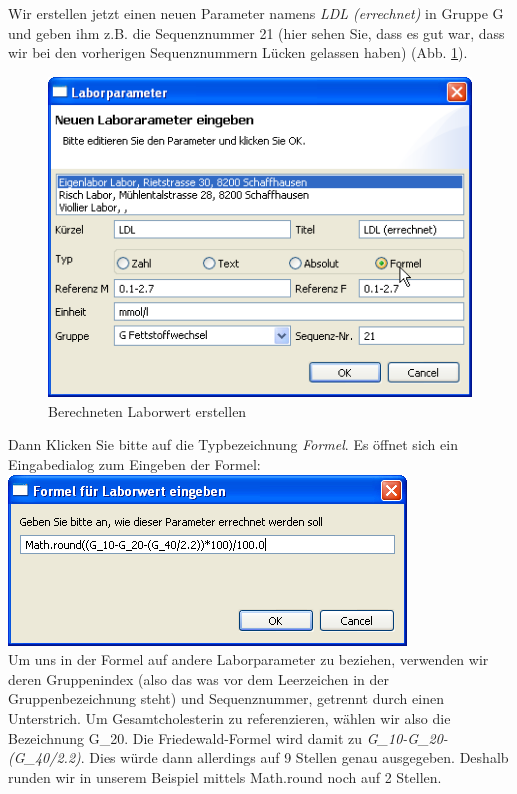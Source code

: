 Wir erstellen jetzt einen neuen Parameter namens \textit{LDL (errechnet)} in Gruppe G und geben ihm z.B. die Sequenznummer 21 (hier sehen Sie, dass es gut war, dass wir bei den vorherigen Sequenznummern Lücken gelassen haben) (Abb. \ref{fig:labor2}).
\begin{figure}[htp]
\begin{center}
  \includegraphics{images/labor2}
  \caption{Berechneten Laborwert erstellen}
  \label{fig:labor2}
\end{center}
\end{figure}
 Dann Klicken Sie bitte auf die Typbezeichnung \textit{Formel}. Es öffnet sich ein Eingabedialog zum Eingeben der Formel:\\
 \includegraphics{images/labor3}\\
Um uns in der Formel auf andere Laborparameter zu beziehen, verwenden wir deren Gruppenindex (also das was vor dem Leerzeichen in der Gruppenbezeichnung steht) und Sequenznummer, getrennt durch einen Unterstrich. Um Gesamtcholesterin zu referenzieren, wählen wir also die Bezeichnung G\_20. Die Friedewald-Formel wird damit zu \textit{G\_10-G\_20-(G\_40/2.2)}. Dies würde dann allerdings auf 9 Stellen genau ausgegeben. Deshalb runden wir in unserem Beispiel mittels Math.round noch auf 2 Stellen.


